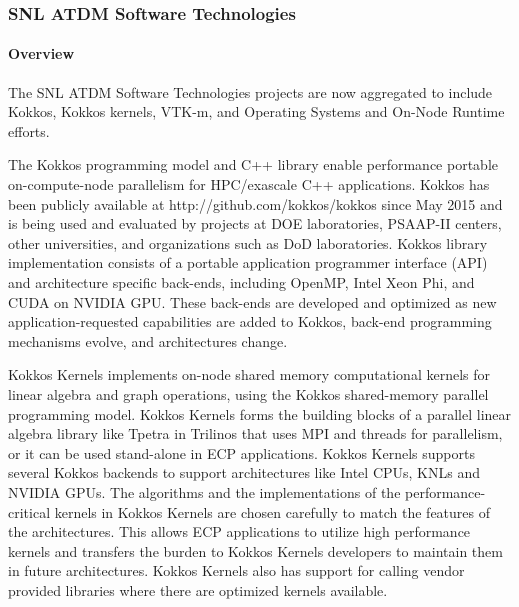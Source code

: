 \subsubsection{ SNL ATDM Software Technologies}

\paragraph{Overview}

The SNL ATDM Software Technologies projects are now aggregated to include Kokkos, Kokkos kernels, VTK-m, and Operating Systems and On-Node Runtime efforts. 

The Kokkos programming model and C++ library enable performance portable on-compute-node parallelism for HPC/exascale C++ applications. Kokkos has been publicly available at http://github.com/kokkos/kokkos since May 2015 and is being used and evaluated by projects at DOE laboratories, PSAAP-II centers, other universities, and organizations such as DoD laboratories. Kokkos library implementation consists of a portable application programmer interface (API) and architecture specific back-ends, including OpenMP, Intel Xeon Phi, and CUDA on NVIDIA GPU. These back-ends are developed and optimized as new application-requested capabilities are added to Kokkos, back-end programming mechanisms evolve, and architectures change.

Kokkos Kernels implements on-node shared memory computational kernels for linear algebra and graph operations, using the Kokkos shared-memory parallel programming model. Kokkos Kernels forms the building blocks of a parallel linear algebra library like Tpetra in Trilinos that uses MPI and threads for parallelism, or it can be used stand-alone in ECP applications. Kokkos Kernels supports several Kokkos backends to support architectures like Intel CPUs, KNLs and NVIDIA GPUs. The algorithms and the implementations of the performance-critical kernels in Kokkos Kernels are chosen carefully to match the features of the architectures. This allows ECP applications to utilize high performance kernels and transfers the burden to Kokkos Kernels developers to maintain them in future architectures. Kokkos Kernels also has support for calling vendor provided libraries where there are optimized kernels available.

